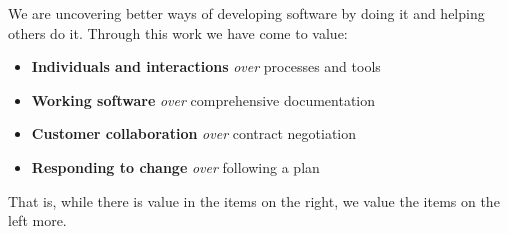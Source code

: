 \begin{displayquote}
We are uncovering better ways of developing software by doing it and helping 
others do it. Through this work we have come to value:

\begin{itemize}
	\item \textbf{Individuals and interactions} \textit{over} processes and tools 
	\item \textbf{Working software} \textit{over} comprehensive documentation 
	\item \textbf{Customer collaboration} \textit{over} contract negotiation 
	\item \textbf{Responding to change} \textit{over} following a plan 
\end{itemize}

That is, while there is value in the items on the right, we value the items on
the left more.
\end{displayquote}


